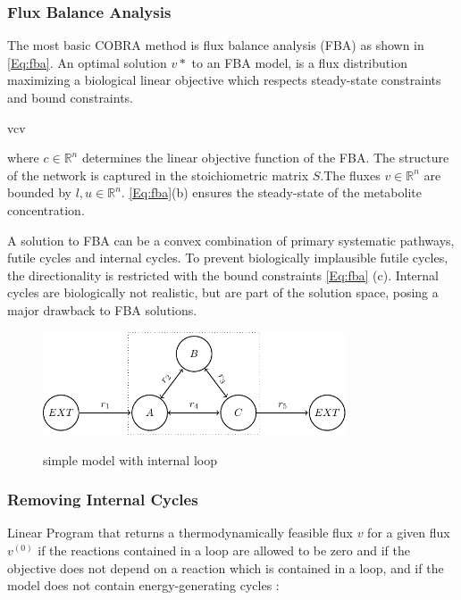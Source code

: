 \subsubsection{Flux Balance Analysis}
The most basic COBRA method is flux balance analysis (FBA) as shown in \cref{Eq:fba}. An optimal solution $v*$ to an FBA model, is a flux distribution maximizing a biological linear objective which respects steady-state constraints and bound constraints.

\begin{maxi!}
  {\scriptstyle v}{c\tran v}{ \label{Eq:fba}}{}
\end{maxi!}

where $c \in \mathbb{R}^n$ determines the linear objective function of the FBA. The structure of the network is captured in the stoichiometric matrix $S$.The fluxes $v \in \mathbb{R}^n$ are bounded by $l,u \in \mathbb{R}^n$. \cref{Eq:fba}(b) ensures the steady-state of the metabolite concentration. 


A solution to FBA can be a convex combination of primary systematic pathways, futile cycles and internal cycles. To prevent biologically implausible futile cycles, the directionality is restricted with the bound constraints \cref{Eq:fba} (c). Internal cycles are biologically not realistic, but are part of the solution space, posing a major drawback to FBA solutions. 

\begin{figure}[h!]
    \caption{simple model with internal loop}
    \centering
    \includegraphics[width=0.8\textwidth]{Images/tikz_graphs_one_loop.pdf}
    \label{fig:loop}
\end{figure}

\subsubsection*{Removing Internal Cycles}
Linear Program that returns a thermodynamically feasible flux $v$ for a given flux $v^{(0)}$ \cite{desouki_cyclefreeflux_2015-1} if the reactions contained in a loop are allowed to be zero and if the objective does not depend on a reaction which is contained in a loop, and if the model does not contain energy-generating cycles \cite{noor_removing_2018}:

